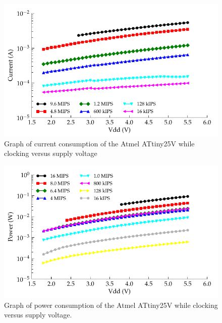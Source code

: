 \begin{figure}
  \centering
    \includegraphics{content/appendices/microprocessorPowerMeasurements/graphics/Graph_ATtiny13V_Clock_Current}
  \caption{\label{fig:ATtiny25VClkCurrent}Graph of current consumption of the Atmel ATtiny25V while clocking versus supply voltage}
\end{figure}

\begin{figure}
  \centering
    \includegraphics{content/appendices/microprocessorPowerMeasurements/graphics/Graph_ATtiny25V_Clock_Power}
  \caption{\label{fig:ATtiny25VClkPower}Graph of power consumption of the Atmel ATtiny25V while clocking versus supply voltage.}
\end{figure}

